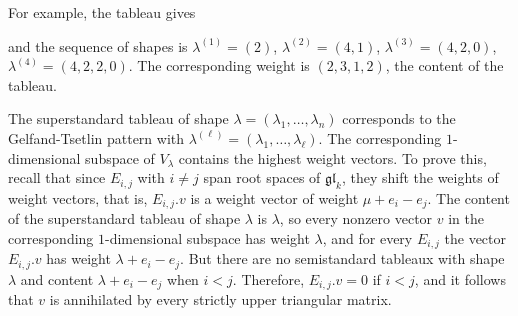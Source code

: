 For example, the tableau 
gives








and the sequence of shapes is $\lambda^{(1)}=(2)$, $\lambda^{(2)}=(4,1)$, $\lambda^{(3)}=(4,2,0)$, $\lambda^{(4)}=(4,2,2,0)$.
The corresponding weight is $(2,3,1,2)$, the content of the tableau.





The superstandard tableau of shape $\lambda=(\lambda_{1},\dots,\lambda_{n})$ corresponds to the Gelfand-Tsetlin pattern with $\lambda^{(\ell)}=(\lambda_{1},\dots,\lambda_{\ell})$.
The corresponding $1$-dimensional subspace of $V_{\lambda}$ contains the highest weight vectors.
To prove this, recall that since $E_{i,j}$ with $i\neq j$ span root spaces of $\mathfrak{gl}_{k}$, they shift the weights of weight vectors, that is, $E_{i,j}.v$ is a weight vector of weight $\mu+e_{i}-e_{j}$.
The content of the superstandard tableau of shape $\lambda$ is $\lambda$, so every nonzero vector $v$ in the corresponding $1$-dimensional subspace has weight $\lambda$, and for every $E_{i,j}$ the vector $E_{i,j}.v$ has weight $\lambda+e_{i}-e_{j}$. But there are no semistandard tableaux with shape $\lambda$ and content $\lambda+e_{i}-e_{j}$ when $i<j$.
Therefore, $E_{i,j}.v=0$ if $i<j$, and it follows that $v$ is annihilated by every strictly upper triangular matrix.




